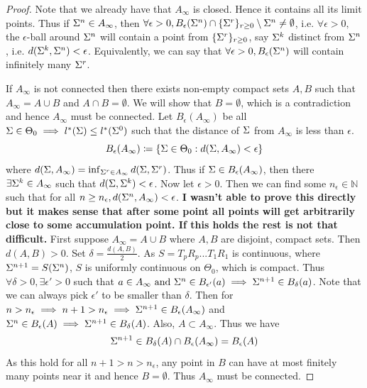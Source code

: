 \documentclass[12pt, leqno]{article}
\def\s{\ensuremath\Sigma}
\begin{document}
\begin{proof}
Note that we already have that $A_{\infty}$ is closed. Hence it
contains all its limit points. Thus if $\s^n \in A_{\infty}$, then $
\forall \epsilon >0, B_{\epsilon}(\s^n) \cap \{\s^r\}_{r \geq 0} \setminus \s^n
\not= \emptyset$, i.e.  $
\forall \epsilon >0,$ the $\epsilon$-ball around $\s^n$ will contain
a point from $\{\s^r\}_{r \geq 0}$, say $\s^k$ distinct from $\s^n$,
i.e. $d(\s^k,\s^n) < \epsilon$. Equivalently, we can say that $\forall
\epsilon >0, B_{\epsilon}(\s^n)$ will contain infinitely many $\s^r$.

If $A_{\infty}$ is not connected then there exists
non-empty compact sets $A,B$ 
such that $A_{\infty} = A \cup B$ and $A \cap B = \emptyset$. We will
show that $B = \emptyset$, which is a contradiction and hence
$A_{\infty}$ must be connected. Let $B_{\epsilon}(A_{\infty})$ be all
$\s \in \Theta_0 \implies l^*(\s) \leq l^*(\s^0)$ such that the distance
of $\s$ from $A_{\infty}$ is less than $\epsilon$. 
\[
B_{\epsilon}(A_{\infty}) \coloneqq \{\s \in \Theta_0:d(\s,A_{\infty})<\epsilon\}
\] 
where $d(\s,A_{\infty}) = \inf_{\s^r \in A_{\infty}} d(\s,\s^r)$. Thus
if $\s \in B_{\epsilon}(A_{\infty})$, then there $\exists \s^k \in
A_{\infty}$ such that $d(\s,\s^k)<\epsilon$. Now
let $\epsilon>0$. Then we can find some $n_{\epsilon} \in \mathbb{N}$
such that for all $n \geq n_{\epsilon}, d(\s^n,A_{\infty}) <
\epsilon$. \textbf{I wasn't able to prove this directly but it makes
  sense that after some point all points will get arbitrarily
  close to some accumulation point. If this holds the rest is not that
difficult.} First suppose $A_{\infty} = A \cup B$ where $A,B$ are
disjoint, compact sets. Then  $d(A,B) > 0$. Set $\delta =
\frac{d(A,B)}{2}$. As $S = T_pR_p... T_1R_1$  is continuous, where $\s^{n+1} = S(\s^n)$, $S$ is
uniformly continuous on $\Theta_0$, which is 
compact. Thus $\forall \delta>0, \exists \epsilon'>0$ such that $a
\in A_{\infty} \text{ and } \s^n \in B_{\epsilon'}(a) \implies \s^{n+1} \in
B_{\delta}(a)$. Note that we can always pick $\epsilon'$ to be smaller
than $\delta$. Then for $n>n_{\epsilon} \implies n+1>n_{\epsilon}
\implies \s^{n+1} \in B_{\epsilon}(A_{\infty})$ and $\s^n \in
B_{\epsilon}(A) \implies \s^{n+1} \in B_{\delta}(A)$. Also, $A \subset
A_{\infty}$. Thus we have 
\[
\s^{n+1} \in B_{\delta}(A) \cap B_{\epsilon}(A_{\infty}) = B_{\epsilon}(A) 
\]
As this hold for all $n+1>n>n_{\epsilon}$, any point in $B$ can have at most
finitely many points near it and hence $B = \emptyset$. Thus
$A_{\infty}$ must be connected.
\end{proof}
\end{document}
